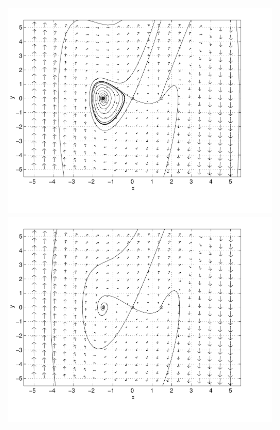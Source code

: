 \documentclass{ximera}
\begin{document}
\begin{computerExercise}
\begin{solution}
\begin{figure}[htb]
                       \centerline{%
                       \includegraphics[width=2.75in]{exfigure/8-1-2a.pdf}
                       \includegraphics[width=2.75in]{exfigure/8-1-2b.pdf}}
\end{figure}

\end{solution}
\end{computerExercise}
\end{document}
